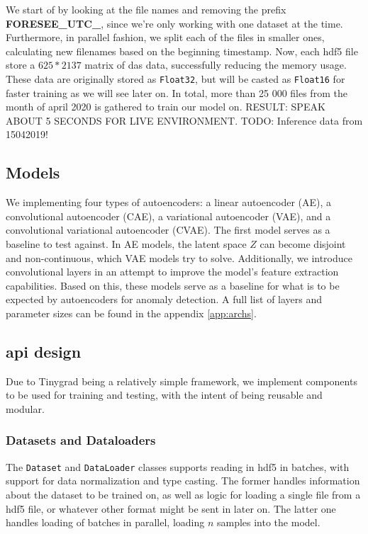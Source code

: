We start of by looking at the file names and removing the prefix \textbf{FORESEE\_UTC\_}, since we're only working with one dataset at the time. Furthermore, in parallel fashion, we split each of the files in smaller ones, calculating new filenames based on the beginning timestamp. Now, each \acrshort{hdf5} file store a $625*2137$ matrix of \acrshort{das} data, successfully reducing the memory usage. 
These data are originally stored as \texttt{Float32}, but will be casted as \texttt{Float16} for faster training as we will see later on. In total, more than 25 000 files from the month of april 2020 is gathered to train our model on. 
RESULT: SPEAK ABOUT 5 SECONDS FOR LIVE ENVIRONMENT.
TODO: Inference data from 15042019!

\subsection{Models} 

We implementing four types of autoencoders: a linear autoencoder (AE), a convolutional autoencoder (CAE), a variational autoencoder (VAE), and a convolutional variational autoencoder (CVAE). The first model serves as a baseline to test against. In AE models, the latent space $Z$ can become disjoint and non-continuous, which VAE models try to solve. Additionally, we introduce convolutional layers in an attempt to improve the model's feature extraction capabilities. Based on this, these models serve as a baseline for what is to be expected by autoencoders for anomaly detection. A full list of layers and parameter sizes can be found in the appendix \ref{app:archs}. \\

\subsection{\acrshort{api} design}

Due to Tinygrad being a relatively simple framework, we implement components to be used for training and testing, with the intent of being reusable and modular.

\subsubsection{Datasets and Dataloaders}

The \texttt{Dataset} and \texttt{DataLoader} classes supports reading in \acrshort{hdf5} in batches, with support for data normalization and type casting. The former handles information about the dataset to be trained on, as well as logic for loading a single file from a \acrshort{hdf5} file, or whatever other format might be sent in later on. The latter one handles loading of batches in parallel, loading $n$ samples into the model.

